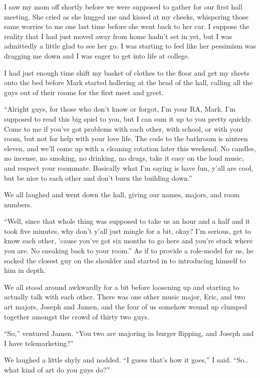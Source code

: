I saw my mom off shortly before we were supposed to gather for our first hall meeting.  She cried as she hugged me and kissed at my cheeks, whispering those same worries to me one last time before she went back to her car.  I suppose the reality that I had just moved away from home hadn't set in yet, but I was admittedly a little glad to see her go.  I was starting to feel like her pessimism was dragging me down and I was eager to get into life at college.

I had just enough time shift my basket of clothes to the floor and get my sheets onto the bed before Mark started hollering at the head of the hall, calling all the guys out of their rooms for the first meet and greet.

``Alright guys, for those who don't know or forgot, I'm your RA, Mark.  I'm supposed to read this big spiel to you, but I can sum it up to you pretty quickly.  Come to me if you've got problems with each other, with school, or with your room, but not for help with your love life.  The code to the bathroom is ninteen eleven, and we'll come up with a cleaning rotation later this weekend.  No candles, no incense, no smoking, no drinking, no drugs, take it easy on the loud music, and respect your roommate.  Basically what I'm saying is have fun, y'all are cool, but be nice to each other and don't burn the building down.''


We all laughed and went down the hall, giving our names, majors, and room numbers.

``Well, since that whole thing was supposed to take us an hour and a half and it took five minutes, why don't y'all just mingle for a bit, okay?  I'm serious, get to know each other, 'cause you've got six months to go here and you're stuck where you are.  No sneaking back to your room.''  As if to provide a role-model for us, he socked the closest guy on the shoulder and started in to introducing himself to him in depth.

We all stood around awkwardly for a bit before loosening up and starting to actually talk with each other.  There was one other music major, Eric, and two art majors, Joseph and Jamen, and the four of us somehow wound up clumped together amongst the crowd of thirty two guys.

``So,'' ventured Jamen.  ``You two are majoring in burger flipping, and Joseph and I have telemarketing?''

We laughed a little shyly and nodded.  ``I guess that's how it goes,'' I said.  ``So.. what kind of art do you guys do?''

